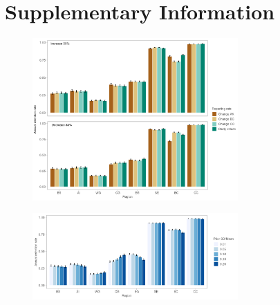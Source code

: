 \documentclass{article}
\begin{document}
\section{Supplementary Information}
\begin{figure}[htb]
    \centering
    \includegraphics[width = 0.7\textwidth]{bar-sensitivity-reporting}
    \caption{}
    \label{fig:bar-sensitivity-reporting}
\end{figure}

\begin{figure}[htb]
    \centering
    \includegraphics[width = 0.7\textwidth]{bar-sensitivity-harvest-priors.png}
    \caption{}
    \label{fig:bar-sensitivity-harvest-priors}
\end{figure}
\end{document}
